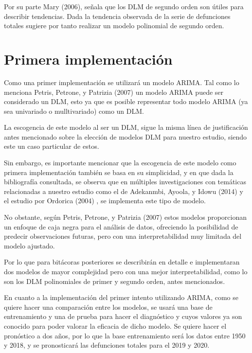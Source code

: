 \documentclass[
  letterpaper,
  onepage,
  openany]{report}
\begin{document}
Por su parte Mary (2006), señala que los DLM de segundo orden son útiles
para describir tendencias. Dada la tendencia observada de la serie de
defunciones totales sugiere por tanto realizar un modelo polinomial de
segundo orden.

\hypertarget{primera-implementaciuxf3n}{%
\section{Primera implementación}\label{primera-implementaciuxf3n}}

Como una primer implementación se utilizará un modelo ARIMA. Tal como lo
menciona Petris, Petrone, y Patrizia (2007) un modelo ARIMA puede ser
considerado un DLM, esto ya que es posible representar todo modelo ARIMA
(ya sea univariado o mulltivariado) como un DLM.

La escogencia de este modelo al ser un DLM, sigue la misma línea de
justificación antes mencionado sobre la elección de modelos DLM para
nuestro estudio, siendo este un caso particular de estos.

Sin embargo, es importante mencionar que la escogencia de este modelo
como primera implementación también se basa en su simplicidad, y en que
dada la bibliografía consultada, se observa que en múltiples
investigaciones con temáticas relacionadas a nuestro estudio como el de
Adekanmbi, Ayoola, y Idowu (2014) y el estudio por Ordorica (2004) , se
implementa este tipo de modelo.

No obstante, según Petris, Petrone, y Patrizia (2007) estos modelos
proporcionan un enfoque de caja negra para el análisis de datos,
ofreciendo la posibilidad de predecir observaciones futuras, pero con
una interpretabilidad muy limitada del modelo ajustado.

Por lo que para bitácoras posteriores se describirán en detalle e
implementaran dos modelos de mayor complejidad pero con una mejor
interpretabilidad, como lo son los DLM polinomiales de primer y segundo
orden, antes mencionados.

En cuanto a la implementación del primer intento utilizando ARIMA, como
se quiere hacer una comparación entre los modelos, se usará una base de
entrenamiento y una de prueba para hacer el diagnóstico y cuyos valores
ya son conocido para poder valorar la eficacia de dicho modelo. Se
quiere hacer el pronóstico a dos años, por lo que la base entrenamiento
será los datos entre 1950 y 2018, y se pronosticará las defunciones
totales para el 2019 y 2020.
\end{document}
